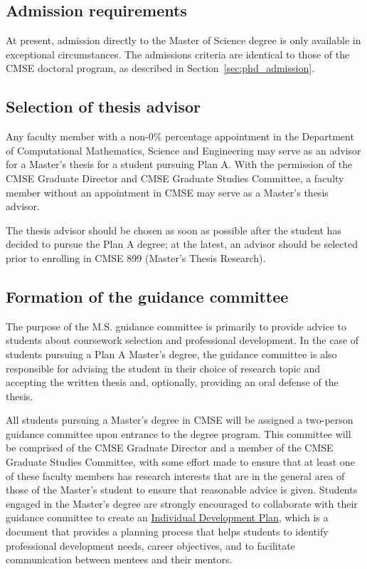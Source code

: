 \subsection{Admission requirements}

At present, admission directly to the Master of Science degree is only
available in exceptional circumstances.  The admissions criteria are
identical to those of the CMSE doctoral program, as described in
Section~\ref{sec:phd_admission}.

\subsection{Selection of thesis advisor}

Any faculty member with a non-0\% percentage appointment in the
Department of Computational Mathematics, Science and Engineering may
serve as an advisor for a Master's thesis for a student pursuing Plan
A.  With the permission of the CMSE Graduate Director and CMSE
Graduate Studies Committee, a faculty member without an appointment in
CMSE may serve as a Master's thesis advisor.  

The thesis advisor should be
chosen as soon as possible after the student has decided to pursue the
Plan A degree; at the latest, an advisor should be selected prior to
enrolling in CMSE 899 (Master's Thesis Research).  


\subsection{Formation of the guidance committee}
\label{sec:ms_guidance_comm}

The purpose of the M.S. guidance committee is primarily to provide
advice to students about coursework selection and professional
development.  In the case of students pursuing a Plan A Master's
degree, the guidance committee is also responsible for advising the
student in their choice of research topic and accepting the written
thesis and, optionally, providing an oral defense of the thesis.

All students pursuing a Master's degree in CMSE will be assigned a
two-person guidance committee upon entrance to the degree program.
This committee will be comprised of the CMSE Graduate Director and a
member of the CMSE Graduate Studies Committee, with some effort made
to ensure that at least one of these faculty members has research
interests that are in the general area of those of the Master's
student to ensure that reasonable advice is given.  Students engaged
in the Master's degree are strongly encouraged to collaborate with
their guidance committee to create an
\href{http://caffe.grd.msu.edu/IDP}{Individual Development Plan},
which is a document that provides a planning process that helps
students to identify professional development needs, career
objectives, and to facilitate communication between mentees and their mentors.

